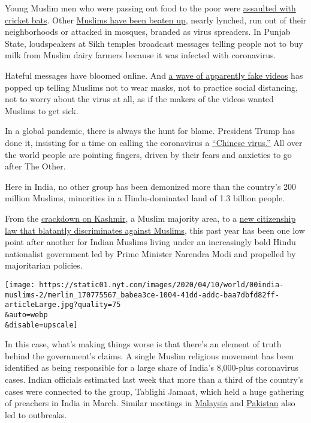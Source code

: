 Young Muslim men who were passing out food to the poor were
\href{https://www.youtube.com/watch?v=_2kx3KRQCnQ}{assaulted with
cricket bats}. Other
\href{https://indianexpress.com/article/coronavirus/covid-19-rumours-linked-to-3-attacks-in-delhi-gurgaon-6350696/}{Muslims
have been beaten up}, nearly lynched, run out of their neighborhoods or
attacked in mosques, branded as virus spreaders. In Punjab State,
loudspeakers at Sikh temples broadcast messages telling people not to
buy milk from Muslim dairy farmers because it was infected with
coronavirus.

Hateful messages have bloomed online. And
\href{https://www.indiatoday.in/india/story/surge-in-tiktok-videos-aimed-at-misleading-indian-muslims-over-coronavirus-precautions-1662930-2020-04-03}{a
wave of apparently fake videos} has popped up telling Muslims not to
wear masks, not to practice social distancing, not to worry about the
virus at all, as if the makers of the videos wanted Muslims to get sick.

In a global pandemic, there is always the hunt for blame. President
Trump has done it, insisting for a time on calling the coronavirus a
\href{https://www.nytimes.com/2020/03/18/us/politics/china-virus.html}{``Chinese
virus.''} All over the world people are pointing fingers, driven by
their fears and anxieties to go after The Other.

Here in India, no other group has been demonized more than the country's
200 million Muslims, minorities in a Hindu-dominated land of 1.3 billion
people.

From the
\href{https://www.nytimes.com/2019/10/07/world/asia/kashmir-doctors-phone.html}{crackdown
on Kashmir}, a Muslim majority area, to a
\href{https://www.nytimes.com/2019/10/07/world/asia/kashmir-doctors-phone.html}{new
citizenship law that blatantly discriminates against Muslims}, this past
year has been one low point after another for Indian Muslims living
under an increasingly bold Hindu nationalist government led by Prime
Minister Narendra Modi and propelled by majoritarian policies.

\texttt{[image: https://static01.nyt.com/images/2020/04/10/world/00india-muslims-2/merlin\_170775567\_babea3ce-1004-41dd-addc-baa7dbfd82ff-articleLarge.jpg?quality=75\\\&auto=webp\\\&disable=upscale]}

In this case, what's making things worse is that there's an element of
truth behind the government's claims. A single Muslim religious movement
has been identified as being responsible for a large share of India's
8,000-plus coronavirus cases. Indian officials estimated last week that
more than a third of the country's cases were connected to the group,
Tablighi Jamaat, which held a huge gathering of preachers in India in
March. Similar meetings in
\href{https://www.nytimes.com/2020/03/20/world/asia/coronavirus-malaysia-muslims-outbreak.html}{Malaysia}
and
\href{https://www.nytimes.com/2020/03/26/world/asia/pakistan-coronavirus-tablighi-jamaat.html}{Pakistan}
also led to outbreaks.

